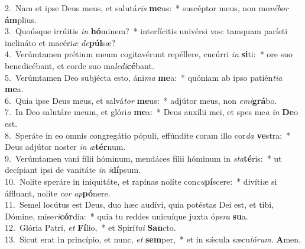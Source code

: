 {2.~}Nam et ipse Deus meus, et salutá\textit{ris} \textbf{me}us:~* suscéptor meus, non mo\textit{vé}\textit{bor} \textbf{ám}plius.\\
{3.~}Quoúsque irrúitis \textit{in} \textbf{hó}minem?~* interfícitis univérsi vos: tamquam paríeti inclináto et macéri\textit{æ} \textit{de}\textbf{púl}sæ?\\
{4.~}Verúmtamen prétium meum cogitavérunt repéllere, cucúrri \textit{in} \textbf{si}ti:~* ore suo benedicébant, et corde suo ma\textit{le}\textit{di}\textbf{cé}bant.\\
{5.~}Verúmtamen Deo subjécta esto, áni\textit{ma} \textbf{me}a:~* quóniam ab ipso patién\textit{ti}\textit{a} \textbf{me}a.\\
{6.~}Quia ipse Deus meus, et salvá\textit{tor} \textbf{me}us:~* adjútor meus, non \textit{e}\textit{mi}\textbf{grá}bo.\\
{7.~}In Deo salutáre meum, et glóri\textit{a} \textbf{me}a:~* Deus auxílii mei, et spes me\textit{a} \textit{in} \textbf{De}o est.\\
{8.~}Speráte in eo omnis congregátio pópuli, effúndite coram illo cor\textit{da} \textbf{ve}stra:~* Deus adjútor noster \textit{in} \textit{æ}\textbf{tér}num.\\
{9.~}Verúmtamen vani fílii hóminum, mendáces fílii hóminum in \textit{sta}\textbf{té}ris:~* ut decípiant ipsi de vanitáte \textit{in} \textit{i}\textbf{dí}psum.\\
{10.~}Nolíte speráre in iniquitáte, et rapínas nolíte con\textit{cu}\textbf{pí}scere:~* divítiæ si áffluant, nolíte \textit{cor} \textit{ap}\textbf{pó}nere.\\
{11.~}Semel locútus est Deus, duo hæc audívi, quia potéstas Dei est, et tibi, Dómine, mise\textit{ri}\textbf{cór}dia:~* quia tu reddes unicuíque juxta ó\textit{pe}\textit{ra} \textbf{su}a.\\
{12.~}Glória Patri, \textit{et} \textbf{Fí}lio,~* et Spirí\textit{tu}\textit{i} \textbf{San}cto.\\
{13.~}Sicut erat in princípio, et nunc, \textit{et} \textbf{sem}per,~* et in sǽcula sæcu\textit{ló}\textit{rum}. \textbf{A}men.\\
